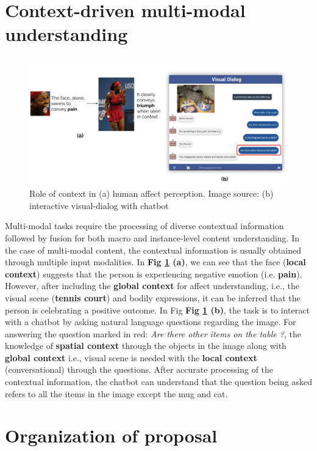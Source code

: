 \section{Context-driven multi-modal understanding}

\begin{figure}[h!]
    \centering
        \includegraphics[width=0.9\linewidth]{figures/Context_drawings.pdf}
        \caption{Role of context in (a) human affect perception. Image source: \cite{barrettcontext}  (b) interactive visual-dialog with chatbot }
        \label{contextmultimodal}
\end{figure}

Multi-modal tasks require the processing of diverse contextual information followed by fusion for both macro and instance-level content understanding. In the case of multi-modal content, the contextual information is usually obtained through multiple input modalities. In \textbf{Fig \ref{contextmultimodal} (a)}, we can see that the face (\textbf{local context}) suggests that the person is experiencing negative emotion (i.e. \textbf{pain}). However, after including the \textbf{global context} for affect understanding, i.e., the visual scene (\textbf{tennis court}) and bodily expressions, it can be inferred that the person is celebrating a positive outcome. In Fig \textbf{Fig \ref{contextmultimodal} (b)}, the task is to interact with a chatbot by asking natural language questions regarding the image.
For answering the question marked in red: \textit{Are there other items on the table ?}, the knowledge of \textbf{spatial context} through the objects in the image along with \textbf{global context} i.e., visual scene is needed with the \textbf{local context} (conversational) through the questions.  After accurate processing of the contextual information, the chatbot can understand that the question being asked refers to all the items in the image except the mug and cat.

\section{Organization of proposal}

